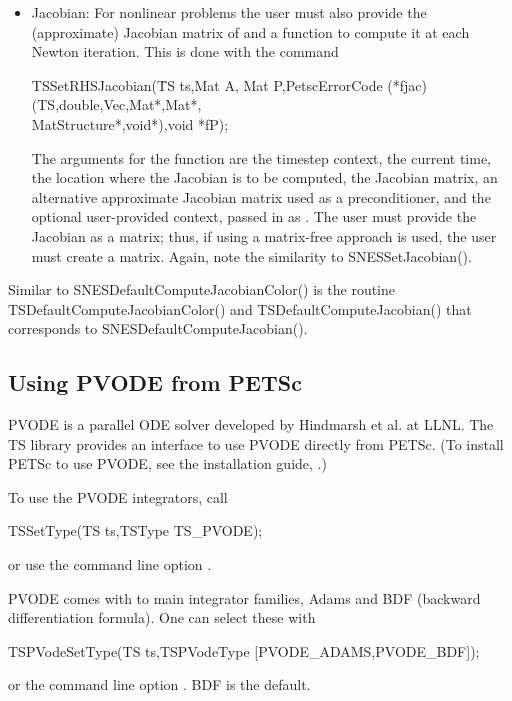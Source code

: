 \begin{itemize}
\item Jacobian: For nonlinear problems the user must also provide the 
(approximate) Jacobian matrix of  and a function to
compute it at each Newton iteration. This is done with the command
\begin{tabbing}
 TSSetRHSJacobian(\=TS ts,Mat A, Mat P,PetscErrorCode (*fjac)(TS,double,Vec,Mat*,Mat*,\\
                  \>        MatStructure*,void*),void *fP);
\end{tabbing}
The  arguments for the function  are
the timestep context, the current time, the location where the
Jacobian is to be computed, the Jacobian matrix, an alternative
approximate Jacobian matrix used as a preconditioner, and the optional
user-provided context, passed in as . The user must provide the 
Jacobian as a matrix; thus, if using a matrix-free approach is used, the
user must create a  matrix. Again, note the similarity
to SNESSetJacobian(). 
\end{itemize}

Similar to SNESDefaultComputeJacobianColor() is the
routine TSDefaultComputeJacobianColor() and TSDefaultComputeJacobian() that 
corresponds to SNESDefaultComputeJacobian(). 
 

\subsection{Using PVODE from PETSc}
\label{sec_pvode}

PVODE is a parallel ODE solver developed by Hindmarsh et al. at LLNL.
The TS library provides an interface to use PVODE directly from PETSc.
(To install PETSc to use PVODE, see the installation guide, .) 

To use the PVODE integrators, call 
\begin{tabbing}
 TSSetType(TS ts,TSType TS\_PVODE);
\end{tabbing}
or use the command line option  .  
  

PVODE comes with to main integrator families, Adams and BDF (backward 
differentiation formula). One can select these with 
\begin{tabbing}
 TSPVodeSetType(TS ts,TSPVodeType [PVODE\_ADAMS,PVODE\_BDF]);
\end{tabbing}
or the command line option . BDF is
the default.  
  

